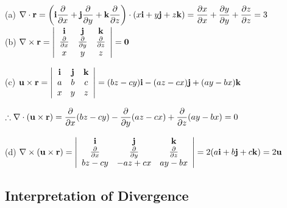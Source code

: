 \begin{spacing}{1.3}
    \sol 
    (a) $\displaystyle \nabla \cdot \mathbf{r}=\left(\mathbf{i} \frac{\partial}{\partial x}+\mathbf{j} \frac{\partial}{\partial y}+\mathbf{k} \frac{\partial}{\partial z}\right) \cdot(x \mathbf{i}+y \mathbf{j}+z \mathbf{k})=
    \frac{\partial x}{\partial x}+\frac{\partial y}{\partial y}+\frac{\partial z}{\partial z}=3$\\
    (b) $\displaystyle \nabla \times \mathbf{r}=\left|\begin{array}{ccc}
            \mathbf{i} & \mathbf{j} & \mathbf{k} \\ 
            \frac{\partial}{\partial x} & \frac{\partial}{\partial y} & \frac{\partial}{\partial z} \\ 
            x & y & z
        \end{array}\right|=\mathbf{0}$

    (c) $\displaystyle \mathbf{u} \times \mathbf{r}=\left|\begin{array}{ccc}
            \mathbf{i} & \mathbf{j} & \mathbf{k} \\ 
            a & b & c \\ 
            x & y & z
        \end{array}\right|=(b z-c y) \mathbf{i}-(a z-c x) \mathbf{j}+(a y-b x) \mathbf{k}$

    $\displaystyle \therefore \nabla \cdot(\mathbf{u} \times \mathbf{r})=\frac{\partial}{\partial x}(b z-c y)-\frac{\partial}{\partial y}(a z-c x)+\frac{\partial}{\partial z}(a y-b x)=0$

    (d) $\displaystyle \nabla \times(\mathbf{u} \times \mathbf{r})=\left|\begin{array}{ccc}\mathbf{i} & \mathbf{j} & \mathbf{k} \\ \frac{\partial}{\partial x} & \frac{\partial}{\partial y} & \frac{\partial}{\partial z} \\ b z-c y & -a z+c x & a y-b x\end{array}\right|=2(a \mathbf{i}+b \mathbf{j}+c \mathbf{k})=2 \mathbf{u}$


    \newpage
    \subsection{Interpretation of Divergence}

    \newcommand{\uu}{{\bf u}}


\end{spacing}
